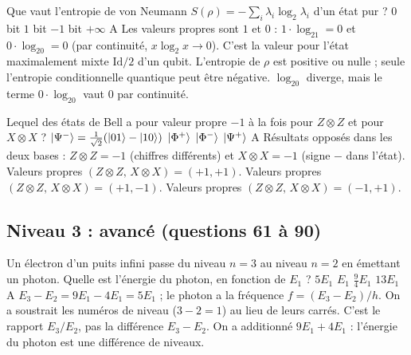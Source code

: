   {Que vaut l'entropie de von Neumann $S(\rho)=-\sum_i\lambda_i\log_2\lambda_i$ d'un état pur ?}
  {$0$ bit}
  {$1$ bit}
  {$-1$ bit}
  {$+\infty$}
  {A}
\qcmx
  {Les valeurs propres sont $1$ et $0$ : $1\cdot\log_21=0$ et $0\cdot\log_20=0$ (par continuité, $x\log_2x\to0$).}
  {C'est la valeur pour l'état maximalement mixte $\mathrm{Id}/2$ d'un qubit.}
  {L'entropie de $\rho$ est positive ou nulle ; seule l'entropie conditionnelle quantique peut être négative.}
  {$\log_20$ diverge, mais le terme $0\cdot\log_20$ vaut $0$ par continuité.}

  {Lequel des états de Bell a pour valeur propre $-1$ à la fois pour $Z\otimes Z$ et pour $X\otimes X$ ?}
  {$|\Psi^-\rangle=\frac{1}{\sqrt2}(|01\rangle-|10\rangle)$}
  {$|\Phi^+\rangle$}
  {$|\Phi^-\rangle$}
  {$|\Psi^+\rangle$}
  {A}
\qcmx
  {Résultats opposés dans les deux bases : $Z\otimes Z=-1$ (chiffres différents) et $X\otimes X=-1$ (signe $-$ dans l'état).}
  {Valeurs propres $(Z\otimes Z,\,X\otimes X)=(+1,+1)$.}
  {Valeurs propres $(Z\otimes Z,\,X\otimes X)=(+1,-1)$.}
  {Valeurs propres $(Z\otimes Z,\,X\otimes X)=(-1,+1)$.}

\clearpage
\subsection{Niveau 3 : avancé (questions 61 à 90)}\label{sec:qcm-n3}
\par\smallskip
  {Un électron d'un puits infini passe du niveau $n=3$ au niveau $n=2$ en émettant un photon. Quelle est l'énergie du photon, en fonction de $E_1$ ?}
  {$5E_1$}
  {$E_1$}
  {$\frac94E_1$}
  {$13E_1$}
  {A}
\qcmx
  {$E_3-E_2=9E_1-4E_1=5E_1$ ; le photon a la fréquence $f=(E_3-E_2)/h$.}
  {On a soustrait les numéros de niveau ($3-2=1$) au lieu de leurs carrés.}
  {C'est le rapport $E_3/E_2$, pas la différence $E_3-E_2$.}
  {On a additionné $9E_1+4E_1$ : l'énergie du photon est une différence de niveaux.}

